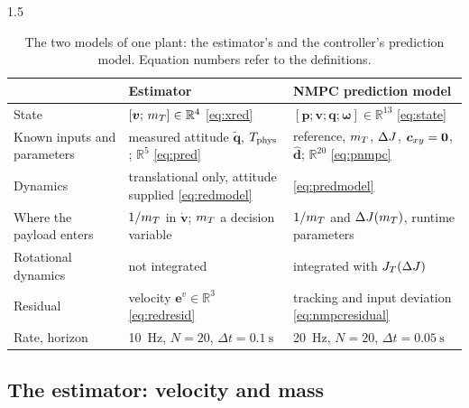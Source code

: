 \begin{spacing}{1.5}
\begin{table}[ht]
\centering
\caption{The two models of one plant: the estimator's and the controller's
prediction model. Equation numbers refer to the definitions.}
\label{tab:models}
\footnotesize
\begin{tabularx}{\textwidth}{@{}>{\raggedright\arraybackslash}p{} >{\raggedright\arraybackslash}X >{\raggedright\arraybackslash}X@{}}
\toprule
 & \textbf{Estimator} & \textbf{NMPC prediction model} \\
\midrule
State & $[\bm v;\,m_T]\in\mathbb R^{4}$ \eqref{eq:xred} & $[\bm p;\bm v;\bm q;\bm\omega]\in\mathbb R^{13}$ \eqref{eq:state} \\
Known inputs and parameters & measured attitude $\tilde{\bm q}$, $T_{\mathrm{phys}}$; $\mathbb R^{5}$ \eqref{eq:pred} & reference, $m_T$, $\Delta J$, $\bm{c}_{xy}=\bm 0$, $\hat{\bm d}$; $\mathbb R^{20}$ \eqref{eq:pnmpc} \\
Dynamics & translational only, attitude supplied \eqref{eq:redmodel} & \eqref{eq:predmodel} \\
Where the payload enters & $1/m_T$ in $\dot{\bm v}$; $m_T$ a decision variable & $1/m_T$ and $\Delta J(m_T)$, runtime parameters \\
Rotational dynamics & not integrated & integrated with $J_T(\Delta J)$ \\
Residual & velocity $\bm e^v\in\mathbb R^{3}$ \eqref{eq:redresid} & tracking and input deviation \eqref{eq:nmpcresidual} \\
Rate, horizon & \SI{10}{\hertz}, $N=20$, $\Delta t=\SI{0.1}{\second}$ & \SI{20}{\hertz}, $N=20$, $\Delta t=\SI{0.05}{\second}$ \\
\bottomrule
\end{tabularx}
\end{table}

\subsection{The estimator: velocity and mass}\label{sec:frame:redmodel}


\end{spacing}
